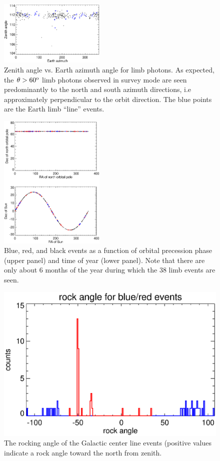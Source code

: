 \documentclass[aps,twocolumn,prd,superscriptaddress,showpacs,nofootinbib,fixfloat]{revtex4}
\newcommand{\degree}{^{\rm o}}
\begin{document}
\begin{figure}
  \centering
  \includegraphics[width=0.45\textwidth]{plots/earth-az.ps}
  \caption{Zenith angle vs. Earth azimuth angle for limb
  photons.  As expected, the $\theta > 60\degree$ limb
  photons observed in survey mode are seen predominantly to
  the north and south azimuth directions, i.e approximately
  perpendicular to the orbit direction. The blue points are
  the Earth limb ``line'' events. }
  \label{fig:earth-az}
\end{figure}

\begin{figure}
  \centering
  \includegraphics[width=0.45\textwidth]{plots/sun.ps}
  \caption{Blue, red, and black events as a function of
  orbital precession phase (upper panel) and time of year
  (lower panel).  Note that there are only about 6 months of
  the year during which the 38 limb events are seen.}
  \label{fig:sun}
\end{figure}

\begin{figure}
  \centering
  \includegraphics[width=0.9\linewidth]{plots/rockangle.ps}
  \caption{The rocking angle of the Galactic center line
  events (positive values indicate a rock angle toward the
  north from zenith.}
  \label{fig:rock}
\end{figure}



\end{document}
